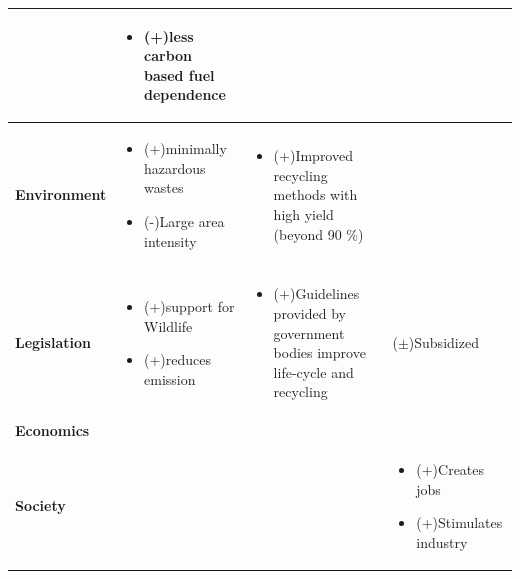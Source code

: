 \documentclass[11pt]{article}
\begin{document}
\begin{table}[h]
\begin{tabular}{p{} p{} p{} p{}}
&
\begin{itemize}[label={}]
  \item (+)less carbon based fuel dependence
\end{itemize}
&
\\
\hline
\textbf{Environment} &
\begin{itemize}[label={}]
  \item (+)minimally hazardous wastes
  \item (-)Large area intensity
\end{itemize}
&
\begin{itemize}[label={}]
  \item (+)Improved recycling methods with high yield (beyond 90 \%)
\end{itemize}
&
\\
\hline
\textbf{Legislation} &
\begin{itemize}[label={}]
  \item (+)support for Wildlife
  \item (+)reduces emission
\end{itemize}
&
\begin{itemize}[label={}]
  \item (+)Guidelines provided by government bodies improve life-cycle and recycling
\end{itemize}
&
($\pm$)Subsidized
\\
\hline
\textbf{Economics} &
&
&
\\

\textbf{Society} &
&
&
\begin{itemize}[label={}]
  \item (+)Creates jobs
  \item (+)Stimulates industry
\end{itemize}
\\


\end{tabular}
\end{table}
\end{document}
